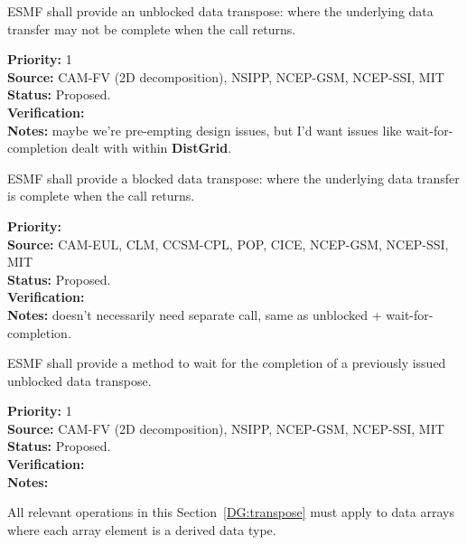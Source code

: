  \label{DG:transpose}


ESMF shall provide an unblocked data transpose: where the underlying
data transfer may not be complete when the call returns.

\begin{reqlist}
{\bf Priority:} 1 \\ 
{\bf Source:} CAM-FV (2D decomposition), NSIPP, NCEP-GSM, NCEP-SSI, MIT \\
{\bf Status:} Proposed. \\
{\bf Verification:} \\
{\bf Notes:} maybe we're pre-empting design issues, but I'd want
  issues like wait-for-completion dealt with within \textbf{DistGrid}.
\end{reqlist}


ESMF shall provide a blocked data transpose: where the underlying
data transfer is complete when the call returns.

\begin{reqlist}
{\bf Priority:} \\
{\bf Source:} CAM-EUL, CLM, CCSM-CPL, POP, CICE, NCEP-GSM, NCEP-SSI, MIT \\
{\bf Status:} Proposed. \\
{\bf Verification:} \\
{\bf Notes:} doesn't necessarily need separate call, same as unblocked
  + wait-for-completion.
\end{reqlist}


ESMF shall provide a method to wait for the completion of a previously
issued unblocked data transpose.

\begin{reqlist}
{\bf Priority:} 1 \\ 
{\bf Source:} CAM-FV (2D decomposition), NSIPP, NCEP-GSM, NCEP-SSI, MIT \\
{\bf Status:} Proposed. \\
{\bf Verification:} \\
{\bf Notes:}
\end{reqlist}


All relevant operations in this Section~\ref{DG:transpose} must apply to
data arrays where each array element is a derived data type.


